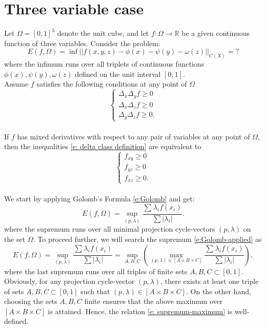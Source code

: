 \documentclass[12p]{article}
\numberwithin{equation}{section}
\begin{document}
\section{Three variable case}
\bigskip

Let \(\Omega=[0,1]^3\) denote the unit cube, and let \(f:\Omega\rightarrow \mathbb{R}\) be a given continuous function of three variables. Consider the problem:
\[
    E(f,\Omega)=\inf||f(x,y,z)-\phi(x)-\psi(y)-\omega(z)||_{C(X)}=?
\]
where the infimum runs over all triplets of continuous functions \(\phi(x),\psi(y),\omega(z)\) defined on the unit interval \([0,1]\).
\\
Assume \(f\) satisfies the following conditions at any point of \(\Omega\)
\begin{equation} \label{e: delta class definition}
    \begin{cases}
        \Delta_x\Delta_y f\ge 0\\
        \Delta_x\Delta_z f\ge 0\\
        \Delta_y\Delta_z f\ge 0.
    \end{cases}
\end{equation}
\\
If \(f\) has mixed derivatives with respect to any pair of variables at any point of \(\Omega\), then the inequalities \eqref{e: delta class definition} are equivalent to
\begin{equation} \label{e:definition of the class}
    \begin{cases}
        f_{xy}\ge 0\\
        f_{yz}\ge 0\\
        f_{xz}\ge 0.
    \end{cases}
\end{equation}
\\
We start by applying Golomb's Formula \eqref{e:Golomb} and get:
\begin{equation} \label{e:Golomb-applied}
   E(f,\Omega)=\sup_{(p,\lambda)} \frac{\sum_{}\lambda_if(x_i)}{\sum|\lambda_i|}. 
\end{equation}
where the supremum runs over all minimal projection cycle-vectors \((p,\lambda)\) on the set \(\Omega\). To proceed further, we will search the supremum \eqref{e:Golomb-applied} as
\begin{equation} \label{e: supremum-maximum}
   E(f,\Omega)=\sup_{(p,\lambda)} \frac{\sum_{}\lambda_if(x_i)}{\sum|\lambda_i|}=\sup_{A,B,C}  \left({\max_{(p,\lambda)\in [A\times B\times C]} \frac{\sum_{}\lambda_if(x_i)}{\sum|\lambda_i|}}\right),
\end{equation}
where the last supremum runs over all triples of finite sets \(A,B,C \subset [0,1]\).
Obviously, for any  projection cycle-vector \((p,\lambda)\), there exists at least one triple of sets \(A,B,C \subset [0,1]\) such that \((p,\lambda) \in [A\times B\times C]\). On the other hand, choosing the sets \(A,B,C\) finite ensures that the above maximum over \([A\times B\times C]\) is attained. Hence, the relation \eqref{e: supremum-maximum} is well-defined. 
\end{document}

